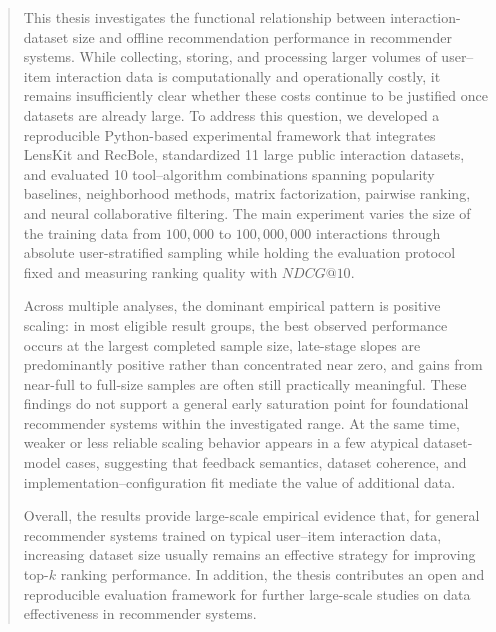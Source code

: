 \documentclass[12pt,a4paper]{article}
\begin{document}
\clearpage

\begin{abstract}
\normalsize
This thesis investigates the functional relationship between interaction-dataset size and offline recommendation performance in recommender systems. While collecting, storing, and processing larger volumes of user--item interaction data is computationally and operationally costly, it remains insufficiently clear whether these costs continue to be justified once datasets are already large. To address this question, we developed a reproducible Python-based experimental framework that integrates LensKit and RecBole, standardized 11 large public interaction datasets, and evaluated 10 tool--algorithm combinations spanning popularity baselines, neighborhood methods, matrix factorization, pairwise ranking, and neural collaborative filtering. The main experiment varies the size of the training data from $100{,}000$ to $100{,}000{,}000$ interactions through absolute user-stratified sampling while holding the evaluation protocol fixed and measuring ranking quality with $NDCG@10$.

Across multiple analyses, the dominant empirical pattern is positive scaling: in most eligible result groups, the best observed performance occurs at the largest completed sample size, late-stage slopes are predominantly positive rather than concentrated near zero, and gains from near-full to full-size samples are often still practically meaningful. These findings do not support a general early saturation point for foundational recommender systems within the investigated range. At the same time, weaker or less reliable scaling behavior appears in a few atypical dataset-model cases, suggesting that feedback semantics, dataset coherence, and implementation--configuration fit mediate the value of additional data.

Overall, the results provide large-scale empirical evidence that, for general recommender systems trained on typical user--item interaction data, increasing dataset size usually remains an effective strategy for improving top-$k$ ranking performance. In addition, the thesis contributes an open and reproducible evaluation framework for further large-scale studies on data effectiveness in recommender systems.
\end{abstract}

\clearpage
{}
\tableofcontents

\newpage
{}

\end{document}
